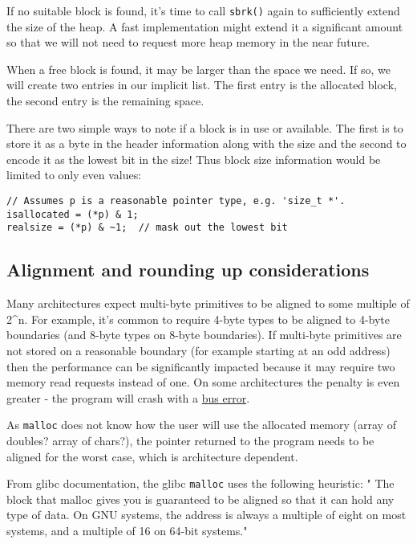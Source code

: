 If no suitable block is found, it's time to call \texttt{sbrk()} again
to sufficiently extend the size of the heap. A fast implementation might
extend it a significant amount so that we will not need to request more
heap memory in the near future.

When a free block is found, it may be larger than the space we need. If
so, we will create two entries in our implicit list. The first entry is
the allocated block, the second entry is the remaining space.

There are two simple ways to note if a block is in use or available. The
first is to store it as a byte in the header information along with the
size and the second to encode it as the lowest bit in the size! Thus
block size information would be limited to only even values:

\begin{verbatim}
// Assumes p is a reasonable pointer type, e.g. 'size_t *'.
isallocated = (*p) & 1;
realsize = (*p) & ~1;  // mask out the lowest bit
\end{verbatim}

\subsection{Alignment and rounding up
considerations}\label{alignment-and-rounding-up-considerations}

Many architectures expect multi-byte primitives to be aligned to some
multiple of 2\^{}n. For example, it's common to require 4-byte types to
be aligned to 4-byte boundaries (and 8-byte types on 8-byte boundaries).
If multi-byte primitives are not stored on a reasonable boundary (for
example starting at an odd address) then the performance can be
significantly impacted because it may require two memory read requests
instead of one. On some architectures the penalty is even greater - the
program will crash with a
\href{http://en.wikipedia.org/wiki/Bus_error\#Unaligned_access}{bus
error}.

As \texttt{malloc} does not know how the user will use the allocated
memory (array of doubles? array of chars?), the pointer returned to the
program needs to be aligned for the worst case, which is architecture
dependent.

From glibc documentation, the glibc \texttt{malloc} uses the following
heuristic: " The block that malloc gives you is guaranteed to be aligned
so that it can hold any type of data. On GNU systems, the address is
always a multiple of eight on most systems, and a multiple of 16 on
64-bit systems."

